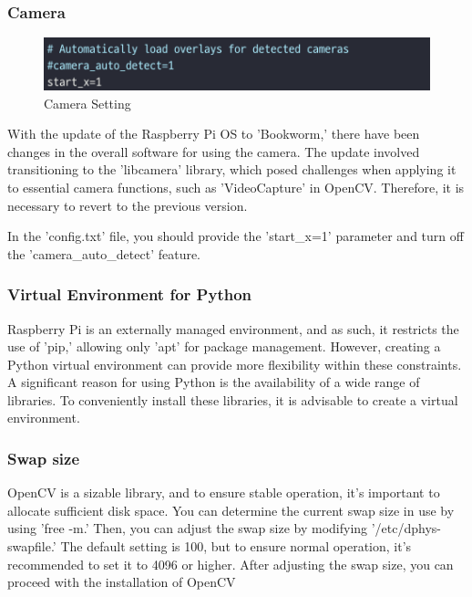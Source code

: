 \subsubsection{\textbf{Camera}}
\begin{figure}[h]
    \centering
    \includegraphics[width=0.5\linewidth]{images/camera.png}
    \caption{Camera Setting}
    \label{fig:enter-label}
\end{figure}
With the update of the Raspberry Pi OS to 'Bookworm,' there have been changes in the overall software for using the camera. The update involved transitioning to the 'libcamera' library, which posed challenges when applying it to essential camera functions, such as 'VideoCapture' in OpenCV. Therefore, it is necessary to revert to the previous version.

In the 'config.txt' file, you should provide the 'start\_x=1' parameter and turn off the 'camera\_auto\_detect' feature.\\

\subsubsection{\textbf{Virtual Environment for Python}}
Raspberry Pi is an externally managed environment, and as such, it restricts the use of 'pip,' allowing only 'apt' for package management. However, creating a Python virtual environment can provide more flexibility within these constraints. A significant reason for using Python is the availability of a wide range of libraries. To conveniently install these libraries, it is advisable to create a virtual environment.\\

\subsubsection{\textbf{Swap size}}
OpenCV is a sizable library, and to ensure stable operation, it's important to allocate sufficient disk space. You can determine the current swap size in use by using 'free -m.' Then, you can adjust the swap size by modifying '/etc/dphys-swapfile.' The default setting is 100, but to ensure normal operation, it's recommended to set it to 4096 or higher. After adjusting the swap size, you can proceed with the installation of OpenCV\\

